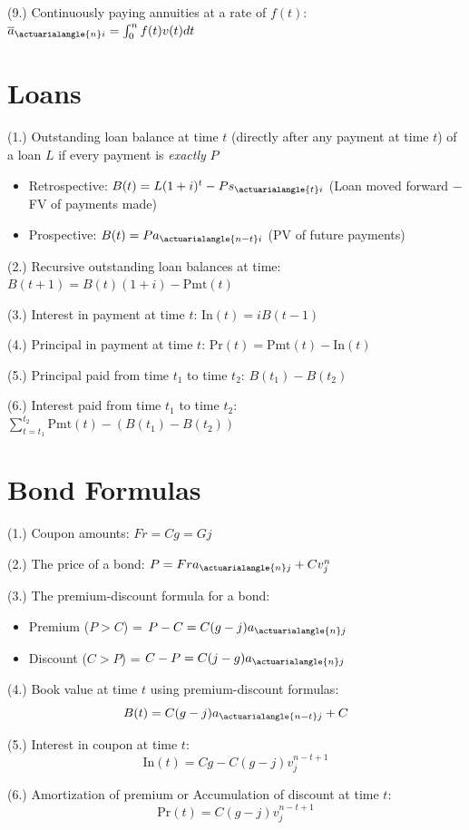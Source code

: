 \documentclass[12pt]{article}
\begin{document}
(9.) Continuously paying annuities at a rate of $f(t)$: $\overline{a}_{\actuarialangle{n}i} = \int_0^n f(t) v(t) dt$

\section{Loans}

(1.) Outstanding loan balance at time $t$ (directly after any payment at time $t$) of a loan $L$ if every payment is \textit{exactly} $P$
\vspace{-.5cm}
\begin{itemize}
    \item Retrospective: $B(t) = L(1+i)^t-Ps_{\actuarialangle{t}i}$ (Loan moved forward $-$ FV of payments made)
    \item Prospective: $B(t) = Pa_{\actuarialangle{n-t}i}$ (PV of future payments)
\end{itemize}

(2.) Recursive outstanding loan balances at time: $B(t+1)= B(t)(1+i)-\text{Pmt}(t)$

(3.) Interest in payment at time $t$: $\text{In}(t) = iB(t-1)$ 

(4.) Principal in payment at time $t$: $\text{Pr}(t) = \text{Pmt}(t)-\text{In}(t)$

(5.) Principal paid from time $t_1$ to time $t_2$: $B(t_1)-B(t_2)$

(6.) Interest paid from time $t_1$ to time $t_2$: $\sum_{t=t_1}^{t_2} \text{Pmt}(t) - (B(t_1)-B(t_2))$

\section{Bond Formulas}

(1.) Coupon amounts: $Fr = Cg = Gj$ 

(2.) The price of a bond: $P = Fra_{\actuarialangle{n} j} + Cv_j^n$

(3.) The premium-discount formula for a bond:
\vspace{-.5cm}
\begin{itemize}
    \item Premium ($P>C$) = $P-C = C(g-j)a_{\actuarialangle{n}j}$
    \item Discount ($C>P$) = $C-P = C(j-g)a_{\actuarialangle{n}j}$ 
\end{itemize}

(4.) Book value at time $t$ using premium-discount formulas: \[B(t) = C(g-j)a_{\actuarialangle{n-t}j}+C\]

(5.) Interest in coupon at time $t$: \[\text{In}(t)=Cg-C(g-j)v_j^{n-t+1}\]

(6.) Amortization of premium or Accumulation of discount at time $t$: \[\text{Pr}(t)=C(g-j)v_j^{n-t+1}\]
\end{document}
